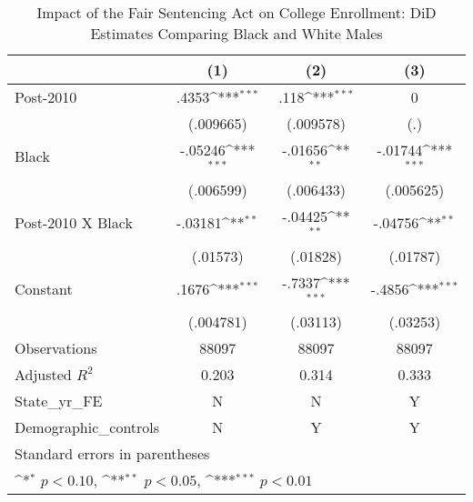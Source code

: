\begin{table}[htbp]\centering
\def\sym#1{\ifmmode^{#1}\else\(^{#1}\)\fi}
\caption{Impact of the Fair Sentencing Act on College Enrollment: DiD Estimates Comparing Black and White Males}
\begin{tabular}{l*{3}{c}}
\hline\hline
                    &\multicolumn{1}{c}{(1)}         &\multicolumn{1}{c}{(2)}         &\multicolumn{1}{c}{(3)}         \\
\hline
Post-2010           &       .4353\sym{***}&        .118\sym{***}&           0         \\
                    &   (.009665)         &   (.009578)         &         (.)         \\
[1em]
Black               &     -.05246\sym{***}&     -.01656\sym{**} &     -.01744\sym{***}\\
                    &   (.006599)         &   (.006433)         &   (.005625)         \\
[1em]
Post-2010 X Black   &     -.03181\sym{**} &     -.04425\sym{**} &     -.04756\sym{**} \\
                    &    (.01573)         &    (.01828)         &    (.01787)         \\
[1em]
Constant            &       .1676\sym{***}&      -.7337\sym{***}&      -.4856\sym{***}\\
                    &   (.004781)         &    (.03113)         &    (.03253)         \\
\hline
Observations        &       88097         &       88097         &       88097         \\
Adjusted \(R^{2}\)  &       0.203         &       0.314         &       0.333         \\
State\_yr\_FE         &           N         &           N         &           Y         \\
Demographic\_controls&           N         &           Y         &           Y         \\
\hline\hline
\multicolumn{4}{l}{\footnotesize Standard errors in parentheses}\\
\multicolumn{4}{l}{\footnotesize \sym{*} \(p<0.10\), \sym{**} \(p<0.05\), \sym{***} \(p<0.01\)}\\
\end{tabular}
\end{table}
